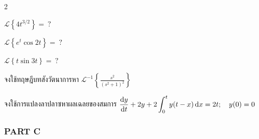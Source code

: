 \documentclass[12pt,final]{novelette} %
\begin{document}
\begin{question}[resume]
\begin{multicols}{2}
\begin{question}
            \item
            $\mathcal{L}\left\{4t^{3/2}\right\} = \ ?$

            \item
            $\mathcal{L}\left\{e^t \cos 2t\right\} = \ ?$

            \item
            $\mathcal{L}\left\{t \sin 3t\right\} = \ ?$
        \end{question}
    \end{multicols}

    \item {}
    จงใช้ทฤษฎีบทสังวัตนาการหา $\displaystyle \mathcal{L}^{-1}\left\{\frac{s^2}{(s^2+1)^2}\right\}$ 



    \item {}
    จงใช้การแปลงลาปลาซหาผลเฉลยของสมการ $\displaystyle \dv{y}{t} + 2y + 2 \int_0^t y(t-x) \dd{x} = 2t; \quad y(0) = 0$ 


\end{question}

\subsubsection*{PART C}
\end{document}

